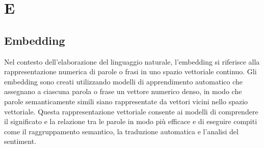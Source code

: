 \section{E}

\vspace{2em}
\subsection*{Embedding}
Nel contesto dell'elaborazione del linguaggio naturale, l'embedding si riferisce alla rappresentazione numerica di parole o frasi in uno spazio vettoriale continuo. Gli embedding sono creati utilizzando modelli di apprendimento automatico che assegnano a ciascuna parola o frase un vettore numerico denso, in modo che parole semanticamente simili siano rappresentate da vettori vicini nello spazio vettoriale. Questa rappresentazione vettoriale consente ai modelli di comprendere il significato e la relazione tra le parole in modo più efficace e di eseguire compiti come il raggruppamento semantico, la traduzione automatica e l'analisi del sentiment.
